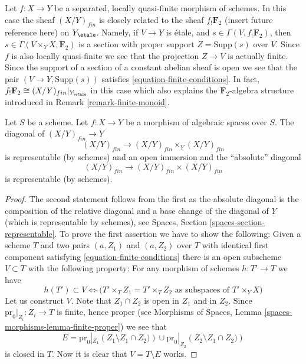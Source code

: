 \begin{remark}
\label{remark-finite-quasi-finite-separated-morphism-schemes}
Let $f : X \to Y$ be a separated, locally quasi-finite
morphism of schemes. In this case the sheaf $(X/Y)_{fin}$
is closely related to the sheaf $f_!\mathbf{F}_2$
(insert future reference here) on $Y_\etale$.
Namely, if $V \to Y$ is \'etale, and $s \in \Gamma(V, f_!\mathbf{F}_2)$,
then $s \in \Gamma(V \times_Y X, \mathbf{F}_2)$ is a section
with proper support $Z = \text{Supp}(s)$ over $V$. Since $f$ is
also locally quasi-finite we see that the projection $Z \to V$ is actually
finite. Since the support of a section of a constant abelian sheaf is open
we see that the pair $(V \to Y, \text{Supp}(s))$ satisfies
\ref{equation-finite-conditions}.
In fact, $f_!\mathbf{F}_2 \cong (X/Y)_{fin}|_{Y_\etale}$
in this case which also explains the $\mathbf{F}_2$-algebra structure
introduced in Remark \ref{remark-finite-monoid}.
\end{remark}

\begin{lemma}
\label{lemma-finite-diagonal}
Let $S$ be a scheme.
Let $f : X \to Y$ be a morphism of algebraic spaces over $S$.
The diagonal of $(X/Y)_{fin} \to Y$
$$
(X/Y)_{fin} \longrightarrow (X/Y)_{fin} \times_Y (X/Y)_{fin}
$$
is representable (by schemes) and an open immersion and the ``absolute''
diagonal
$$
(X/Y)_{fin} \longrightarrow (X/Y)_{fin} \times (X/Y)_{fin}
$$
is representable (by schemes).
\end{lemma}

\begin{proof}
The second statement follows from the first as the absolute diagonal
is the composition of the relative diagonal and a base change
of the diagonal of $Y$ (which is representable by schemes), see
Spaces, Section \ref{spaces-section-representable}.
To prove the first assertion we have to show the following:
Given a scheme $T$ and two pairs $(a, Z_1)$ and $(a, Z_2)$ over $T$
with identical first component
satisfying \ref{equation-finite-conditions}
there is an open subscheme $V \subset T$ with the following
property: For any morphism of schemes $h : T' \to T$ we have
$$
h(T') \subset V \Leftrightarrow
\Big(T' \times_T Z_1 = T' \times_T Z_2
\text{ as subspaces of }T' \times_Y X\Big)
$$
Let us construct $V$. Note that $Z_1 \cap Z_2$ is open in $Z_1$
and in $Z_2$. Since $\text{pr}_0|_{Z_i} : Z_i \to T$ is finite,
hence proper (see
Morphisms of Spaces, Lemma \ref{spaces-morphisms-lemma-finite-proper})
we see that
$$
E =
\text{pr}_0|_{Z_1}\left(Z_1 \setminus Z_1 \cap Z_2)\right)
\cup
\text{pr}_0|_{Z_2}\left(Z_2 \setminus Z_1 \cap Z_2)\right)
$$
is closed in $T$. Now it is clear that $V = T \setminus E$ works.
\end{proof}

